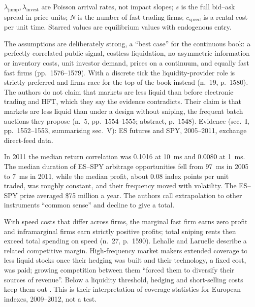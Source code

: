 \begin{qfresult}
 $\lambda_{\mathrm{jump}},\lambda_{\mathrm{invest}}$ are Poisson arrival rates, not impact slopes; $s$ is the full bid--ask spread in price units; $N$ is the number of fast trading firms; $c_{\mathrm{speed}}$ is a rental cost per unit time. Starred values are equilibrium values with endogenous entry.

 The assumptions are deliberately strong, a ``best case'' for the continuous book: a perfectly correlated public signal, costless liquidation, no asymmetric information or inventory costs, unit investor demand, prices on a continuum, and equally fast fast firms (pp.~1576--1579). With a discrete tick the liquidity-provider role is strictly preferred and firms race for the top of the book instead (n.~19, p.~1580). The authors do not claim that markets are less liquid than before electronic trading and HFT, which they say the evidence contradicts. Their claim is that markets are less liquid than under a design without sniping, the frequent batch auctions they propose (n.~5, pp.~1554--1555; abstract, p.~1548). Evidence (sec.~I, pp.~1552--1553, summarising sec.~V): ES futures and SPY, 2005--2011, exchange direct-feed data.

In 2011 the median return correlation was 0.1016 at 10~ms and 0.0080 at 1~ms. The median duration of ES--SPY arbitrage opportunities fell from 97~ms in 2005 to 7~ms in 2011, while the median profit, about 0.08 index points per unit traded, was roughly constant, and their frequency moved with volatility. The ES--SPY prize averaged \$75 million a year. The authors call extrapolation to other instruments ``common sense'' and decline to give a total.

 With speed costs that differ across firms, the marginal fast firm earns zero profit and inframarginal firms earn strictly positive profits; total sniping rents then exceed total spending on speed (n.~27, p.~1590). Lehalle and Laruelle describe a related competitive margin. High-frequency market makers extended coverage to less liquid stocks once their hedging was built and their technology, a fixed cost, was paid; growing competition between them ``forced them to diversify their sources of revenue''. Below a liquidity threshold, hedging and short-selling costs keep them out \citep[sec.~2.4.2, pp.~161--162]{alpha-laruelle}. This is their interpretation of coverage statistics for European indexes, 2009--2012, not a test.


\end{qfresult}
